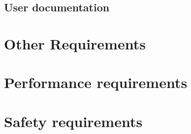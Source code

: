 \documentclass[10pt]{article}
\begin{document}
\lipsum[10]

\subsection{User documentation}

\lipsum[10]



\section{Other Requirements}

\begin{appendices}

	\section{Performance requirements}

	\lipsum[10]

	\section{Safety requirements}

	\lipsum[10]

\end{appendices}
\end{document}
